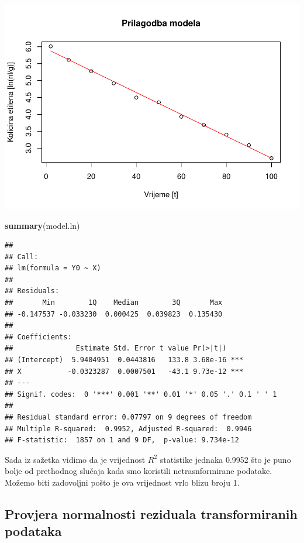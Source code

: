 \documentclass[]{article}
\newenvironment{Shaded}{\begin{snugshade}}{\end{snugshade}}
\newcommand{\KeywordTok}[1]{\textcolor[rgb]{0.13,0.29,0.53}{\textbf{{#1}}}}
\newcommand{\NormalTok}[1]{{#1}}
\begin{document}
\includegraphics{Izvjestaj_files/figure-latex/unnamed-chunk-9-1.pdf}

\begin{Shaded}
\begin{Highlighting}[]
\KeywordTok{summary}\NormalTok{(model.ln)}
\end{Highlighting}
\end{Shaded}

\begin{verbatim}
## 
## Call:
## lm(formula = Y0 ~ X)
## 
## Residuals:
##       Min        1Q    Median        3Q       Max 
## -0.147537 -0.033230  0.000425  0.039823  0.135430 
## 
## Coefficients:
##               Estimate Std. Error t value Pr(>|t|)    
## (Intercept)  5.9404951  0.0443816   133.8 3.68e-16 ***
## X           -0.0323287  0.0007501   -43.1 9.73e-12 ***
## ---
## Signif. codes:  0 '***' 0.001 '**' 0.01 '*' 0.05 '.' 0.1 ' ' 1
## 
## Residual standard error: 0.07797 on 9 degrees of freedom
## Multiple R-squared:  0.9952, Adjusted R-squared:  0.9946 
## F-statistic:  1857 on 1 and 9 DF,  p-value: 9.734e-12
\end{verbatim}

Sada iz sažetka vidimo da je vrijednost \(R^2\) statistike jednaka
0.9952 što je puno bolje od prethodnog slučaja kada smo koristili
netrasnformirane podatake. Možemo biti zadovoljni pošto je ova
vrijednost vrlo blizu broju 1.

\subsection{Provjera normalnosti reziduala transformiranih
podataka}\label{provjera-normalnosti-reziduala-transformiranih-podataka}
\end{document}
